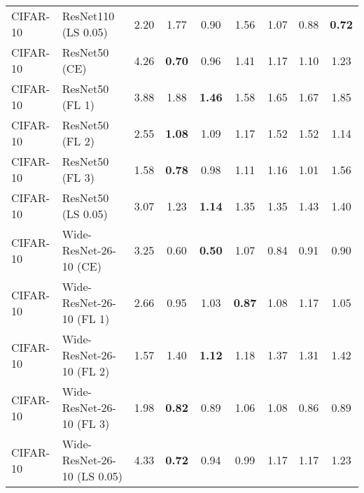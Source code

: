\begin{table}[h!]
{\begin{tabular}{llccccccc}
    CIFAR-10 &         ResNet110 (LS 0.05) &                  2.20 &                  1.77 &                  0.90 &                  1.56 &                  1.07 &                  0.88 & \textbf{0.72} \\
    CIFAR-10 &               ResNet50 (CE) &                  4.26 & \textbf{0.70} &                  0.96 &                  1.41 &                  1.17 &                  1.10 &                  1.23 \\
    CIFAR-10 &             ResNet50 (FL 1) &                  3.88 &                  1.88 & \textbf{1.46} &                  1.58 &                  1.65 &                  1.67 &                  1.85 \\
    CIFAR-10 &             ResNet50 (FL 2) &                  2.55 & \textbf{1.08} &                  1.09 &                  1.17 &                  1.52 &                  1.52 &                  1.14 \\
    CIFAR-10 &             ResNet50 (FL 3) &                  1.58 & \textbf{0.78} &                  0.98 &                  1.11 &                  1.16 &                  1.01 &                  1.56 \\
    CIFAR-10 &          ResNet50 (LS 0.05) &                  3.07 &                  1.23 & \textbf{1.14} &                  1.35 &                  1.35 &                  1.43 &                  1.40 \\
    CIFAR-10 &      Wide-ResNet-26-10 (CE) &                  3.25 &                  0.60 & \textbf{0.50} &                  1.07 &                  0.84 &                  0.91 &                  0.90 \\
    CIFAR-10 &    Wide-ResNet-26-10 (FL 1) &                  2.66 &                  0.95 &                  1.03 & \textbf{0.87} &                  1.08 &                  1.17 &                  1.05 \\
    CIFAR-10 &    Wide-ResNet-26-10 (FL 2) &                  1.57 &                  1.40 & \textbf{1.12} &                  1.18 &                  1.37 &                  1.31 &                  1.42 \\
    CIFAR-10 &    Wide-ResNet-26-10 (FL 3) &                  1.98 & \textbf{0.82} &                  0.89 &                  1.06 &                  1.08 &                  0.86 &                  0.89 \\
    CIFAR-10 & Wide-ResNet-26-10 (LS 0.05) &                  4.33 & \textbf{0.72} &                  0.94 &                  0.99 &                  1.17 &                  1.17 &                  1.23 \\

\end{tabular}}
\end{table}
